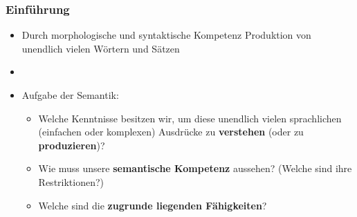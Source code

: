 \begin{frame}
	\frametitle{Einführung}

\begin{itemize}
	\item Durch morphologische und syntaktische Kompetenz \ras Produktion von unendlich vielen Wörtern und Sätzen
	\item[]
	\item Aufgabe der Semantik: 
	
	\begin{itemize}
		\item Welche Kenntnisse besitzen wir, um diese unendlich vielen sprachlichen (einfachen oder komplexen) Ausdrücke zu \textbf{verstehen} (oder zu \textbf{produzieren})?
		
		\item Wie muss unsere \textbf{semantische Kompetenz} aussehen? (Welche sind ihre Restriktionen?)
		
		\item Welche sind die \textbf{zugrunde liegenden Fähigkeiten}?
	\end{itemize}

\end{itemize}

\end{frame}
	
